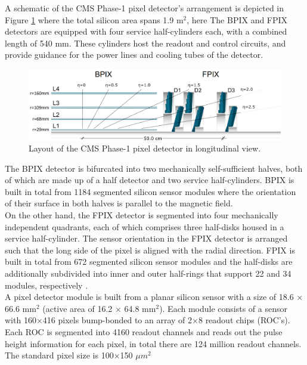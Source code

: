 A schematic of the CMS Phase-1 pixel detector's arrangement is depicted in Figure \ref{phase1_pixel_detector} where the total silicon area spans 1.9 $\text{m}^{2}$, here The BPIX and FPIX detectors are equipped with four service half-cylinders each, with a combined length of 540 mm. These cylinders host the readout and control circuits, and provide guidance for the power lines and cooling tubes of the detector.
\begin{center}
  \begin{figure}[h]
    \centering
    \includegraphics[scale=.26]{Chapter2/phase1_PixelDetector.png}
    \caption[CMS Phase-1 pixel detector]{Layout of the CMS Phase-1 pixel detector in longitudinal view\cite{phase1_Pixel_Detector}.}
    \label{phase1_pixel_detector}
  \end{figure}
\end{center}

 
The BPIX detector is bifurcated into two mechanically self-sufficient halves, both of which are made up of a half detector and two service half-cylinders. BPIX is built in total from 1184 segmented silicon sensor modules where the orientation of their surface  in both halves is parallel to the magnetic field.\\

On the other hand, the FPIX detector is segmented into four mechanically independent quadrants, each of which comprises three half-disks housed in a service half-cylinder. The sensor orientation in the FPIX detector is arranged such that the long side of the pixel is aligned with the radial direction. FPIX is built in total from 672 segmented silicon sensor modules and the half-disks are additionally subdivided into inner and outer half-rings that support 22 and 34 modules, respectively \cite{phase1_Pixel_Detector}.\\

A pixel detector module is built from a planar silicon sensor with a size of 18.6 $\times$ 66.6 $\text{mm}^{2}$ (active area of 16.2 $\times$ 64.8 $\text{mm}^{2}$). Each module consists of a sensor with 160$\times$416 pixels  bump-bonded to an array of 2$\times$8 readout chips (ROC's). Each ROC is segmented into 4160 readout channels and reads out the pulse height information for each pixel, in total there are 124 million readout channels. The standard pixel size is 100$\times$150 $\mu m^{2}$\\

